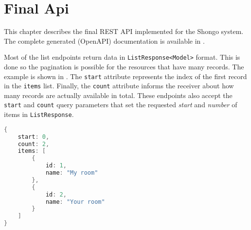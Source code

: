 \chapter{Final Api} \label{cha:api}
This chapter describes the final REST API implemented for the Shongo system. The complete generated (OpenAPI) documentation is available in .

Most of the list endpoints return data in \texttt{ListResponse<Model>} format. This is done so the pagination is possible for the resources that have many records. The example is shown in . The \texttt{start} attribute represents the index of the first record in the \texttt{items} list. Finally, the \texttt{count} attribute informs the receiver about how many records are actually available in total.
These endpoints also accept the \texttt{start} and \texttt{count} query parameters that set the requested \emph{start} and \emph{number} of items in \texttt{ListResponse}. 

\begin{lstlisting}[language=Java, caption=ListResponse, label=lst:listresponse]
{
    start: 0,
    count: 2,
    items: [
        {
            id: 1,
            name: "My room"
        },
        {
            id: 2,
            name: "Your room"
        }
    ]
}
\end{lstlisting}









